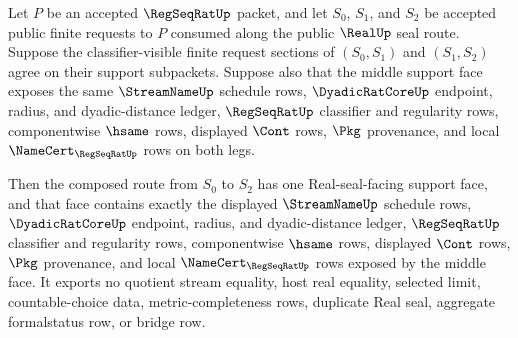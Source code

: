 \begin{theorem}
\label{thm:regseqrat-finite-request-support-face-composition}
Let $P$ be an accepted $\RegSeqRatUp$ packet, and let $S_0$, $S_1$, and
$S_2$ be accepted public finite requests to $P$ consumed along the public
$\RealUp$ seal route. Suppose the classifier-visible finite request sections
of $(S_0,S_1)$ and $(S_1,S_2)$ agree on their support subpackets. Suppose
also that the middle support face exposes the same $\StreamNameUp$ schedule
rows, $\DyadicRatCoreUp$ endpoint, radius, and dyadic-distance ledger,
$\RegSeqRatUp$ classifier and regularity rows, componentwise $\hsame$ rows,
displayed $\Cont$ rows, $\Pkg$ provenance, and local
$\NameCert_{\RegSeqRatUp}$ rows on both legs.

Then the composed route from $S_0$ to $S_2$ has one
Real-seal-facing support face, and that face contains exactly the displayed
$\StreamNameUp$ schedule rows, $\DyadicRatCoreUp$ endpoint, radius, and
dyadic-distance ledger, $\RegSeqRatUp$ classifier and regularity rows,
componentwise $\hsame$ rows, displayed $\Cont$ rows, $\Pkg$ provenance, and
local $\NameCert_{\RegSeqRatUp}$ rows exposed by the middle face. It exports
no quotient stream equality, host real equality, selected limit,
countable-choice data, metric-completeness rows, duplicate Real seal,
aggregate formalstatus row, or bridge row.
\end{theorem}
